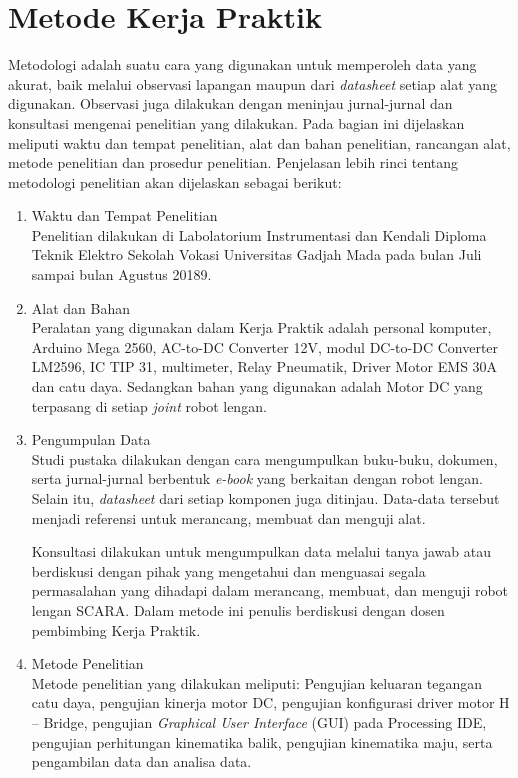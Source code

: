 \section{Metode Kerja Praktik}
Metodologi adalah suatu cara yang digunakan untuk memperoleh data yang akurat, baik melalui observasi lapangan maupun dari \emph {datasheet} setiap alat yang digunakan. Observasi juga dilakukan dengan meninjau jurnal-jurnal dan konsultasi mengenai penelitian yang dilakukan. Pada bagian ini dijelaskan meliputi waktu dan tempat penelitian, alat dan bahan penelitian, rancangan alat, metode penelitian dan prosedur penelitian. Penjelasan lebih rinci tentang metodologi penelitian akan dijelaskan sebagai berikut: 

\begin{enumerate}
	\item Waktu dan Tempat Penelitian \\
	Penelitian dilakukan di Labolatorium Instrumentasi dan Kendali Diploma Teknik Elektro Sekolah Vokasi Universitas Gadjah Mada pada bulan Juli sampai bulan Agustus 20189.
	
	\item Alat dan Bahan \\
	Peralatan yang digunakan dalam Kerja Praktik adalah personal komputer, Arduino Mega 2560, AC-to-DC Converter 12V, modul DC-to-DC Converter LM2596, IC TIP 31, multimeter, Relay Pneumatik, Driver Motor EMS 30A dan catu daya. Sedangkan bahan yang digunakan adalah Motor DC yang terpasang di setiap \emph {joint} robot lengan.
	
	\item  Pengumpulan Data \\
	Studi pustaka dilakukan dengan cara mengumpulkan buku-buku, dokumen, serta jurnal-jurnal berbentuk \emph{e-book} yang berkaitan dengan robot lengan. Selain itu, \emph{datasheet} dari setiap komponen juga ditinjau. Data-data tersebut menjadi referensi untuk merancang, membuat dan menguji alat. 
	
	Konsultasi dilakukan untuk mengumpulkan data melalui tanya jawab atau berdiskusi dengan pihak yang mengetahui dan menguasai segala permasalahan yang dihadapi dalam merancang, membuat, dan menguji robot lengan SCARA. Dalam metode ini penulis berdiskusi dengan dosen pembimbing Kerja Praktik. 
	
	\item Metode Penelitian \\
	Metode penelitian yang dilakukan meliputi: Pengujian keluaran tegangan catu daya, pengujian kinerja motor DC, pengujian konfigurasi driver motor H – Bridge, pengujian \emph{Graphical User Interface }(GUI) pada Processing IDE, pengujian perhitungan kinematika balik, pengujian kinematika maju,  serta pengambilan data dan analisa data.
	

\end{enumerate}
